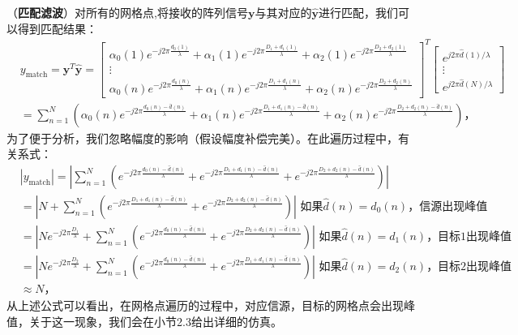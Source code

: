 （\textbf{匹配滤波}）对所有的网格点,将接收的阵列信号$\boldsymbol{y}$与其对应的$\hat{\boldsymbol{y}}$进行匹配，我们可以得到匹配结果：
\begin{align}
  & y_\text{match}  = \boldsymbol{y}^T\hat{\boldsymbol{y}} = \begin{bmatrix}
    \alpha_0(1)e^{-j2\pi\frac{d_0(1)}{\lambda}}+\alpha_1(1)e^{-j2\pi\frac{D_1+d_1(1)}{\lambda}}+\alpha_2(1)e^{-j2\pi\frac{D_2+d_2(1)}{\lambda}} \\
    \vdots \\
    \alpha_0(n)e^{-j2\pi\frac{d_0(n)}{\lambda}}+\alpha_1(n)e^{-j2\pi\frac{D_1+d_1(n)}{\lambda}}+\alpha_2(n)e^{-j2\pi\frac{D_2+d_2(n)}{\lambda}}
  \end{bmatrix}^T
  \begin{bmatrix}
    e^{j2\pi \hat{d}(1)/\lambda} \\
    \vdots \\
    e^{j2\pi \hat{d}(N)/\lambda}  
  \end{bmatrix} \nonumber \\
  & = \sum\limits_{n=1}^N \left(\alpha_0(n)e^{-j2\pi\frac{d_0(n)-\hat{d}(n)}{\lambda}}+\alpha_1(n)e^{-j2\pi\frac{D_1+d_1(n)-\hat{d}(n)}{\lambda}}+\alpha_2(n)e^{-j2\pi\frac{D_2+d_2(n)-\hat{d}(n)}{\lambda}}\right)\text{，}
\end{align}
为了便于分析，我们忽略幅度的影响（假设幅度补偿完美）。在此遍历过程中，有关系式：
\begin{align} 
  & |y_\text{match}| = \left|\sum\limits_{n=1}^N \left(e^{-j2\pi\frac{d_0(n)-\hat{d}(n)}{\lambda}}+e^{-j2\pi\frac{D_1+d_1(n)-\hat{d}(n)}{\lambda}}+e^{-j2\pi\frac{D_2+d_2(n)-\hat{d}(n)}{\lambda}}\right)\right| \nonumber
  \\ 
  & = \left| N + \sum\limits_{n=1}^N \left(e^{-j2\pi\frac{D_1+d_1(n)-\hat{d}(n)}{\lambda}}+e^{-j2\pi\frac{D_2+d_2(n)-\hat{d}(n)}{\lambda}}\right) \right| \text{ 如果}\hat{d}(n)=d_0(n)\text{，信源出现峰值} \nonumber \\
  & = \left| Ne^{-j2\pi\frac{D_1}{\lambda}} +  \sum\limits_{n=1}^N \left(e^{-j2\pi\frac{d_0(n)-\hat{d}(n)}{\lambda}}+e^{-j2\pi\frac{D_2+d_2(n)-\hat{d}(n)}{\lambda}}\right) \right| \text{ 如果}\hat{d}(n)=d_1(n)\text{，目标1出现峰值} \nonumber \\
  & = \left| Ne^{-j2\pi\frac{D_2}{\lambda}} +  \sum\limits_{n=1}^N \left(e^{-j2\pi\frac{d_0(n)-\hat{d}(n)}{\lambda}}+e^{-j2\pi\frac{D_1+d_1(n)-\hat{d}(n)}{\lambda}}\right) \right| \text{ 如果}\hat{d}(n)=d_2(n)\text{，目标2出现峰值} \nonumber \\
  & \approx N \text{，}
\end{align}
从上述公式可以看出，在网格点遍历的过程中，对应信源，目标的网格点会出现峰值，关于这一现象，我们会在小节2.3给出详细的仿真。
